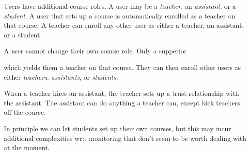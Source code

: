 Users have additional course roles. A user may be a \emph{teacher}, an
\emph{assistant}, or a \emph{student}. A user that sets up a course is
automatically enrolled as a teacher on that course. A teacher can enroll any
other user as either a teacher, an assistant, or a student.

A user cannot change their own course role. Only a supperior

which yields them a
teacher on that course. They can then enroll other users as either
\emph{teachers}, \emph{assistants}, or \emph{students}.

When a teacher hires an assistant, the teacher sets up a trust relationship
with the assistant. The assistant can do anything a teacher can, except kick
teachers off the course.

In principle we can let students set up their own courses, but this may incur
additional complexities wrt. monitoring that don't seem to be worth dealing
with at the moment.

